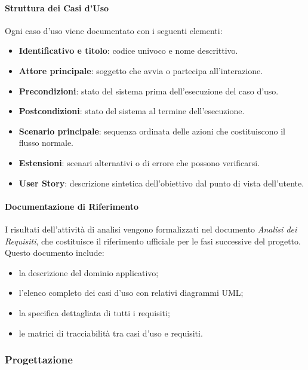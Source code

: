 \documentclass[a4paper, 11pt, oneside]{scrartcl} %
\begin{document}
\paragraph{Struttura dei Casi d'Uso}
Ogni caso d'uso viene documentato con i seguenti elementi:
\begin{itemize}
    \item \textbf{Identificativo e titolo}: codice univoco e nome descrittivo.
    \item \textbf{Attore principale}: soggetto che avvia o partecipa all'interazione.
    \item \textbf{Precondizioni}: stato del sistema prima dell'esecuzione del caso d'uso.
    \item \textbf{Postcondizioni}: stato del sistema al termine dell'esecuzione.
    \item \textbf{Scenario principale}: sequenza ordinata delle azioni che costituiscono il flusso normale.
    \item \textbf{Estensioni}: scenari alternativi o di errore che possono verificarsi.
    \item \textbf{User Story}: descrizione sintetica dell'obiettivo dal punto di vista dell'utente.
\end{itemize}

\paragraph{Documentazione di Riferimento}
I risultati dell'attività di analisi vengono formalizzati nel documento \emph{Analisi dei Requisiti}{\scriptsize{}}, che costituisce il riferimento ufficiale per le fasi successive del progetto.
Questo documento include:
\begin{itemize}
    \item la descrizione del dominio applicativo;
    \item l'elenco completo dei casi d'uso con relativi diagrammi UML;
    \item la specifica dettagliata di tutti i requisiti;
    \item le matrici di tracciabilità tra casi d'uso e requisiti.
\end{itemize}
\subsubsection{Progettazione}
\end{document}
